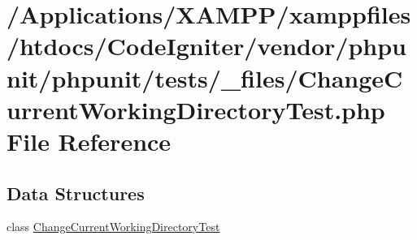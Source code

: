 \hypertarget{_change_current_working_directory_test_8php}{}\section{/\+Applications/\+X\+A\+M\+P\+P/xamppfiles/htdocs/\+Code\+Igniter/vendor/phpunit/phpunit/tests/\+\_\+files/\+Change\+Current\+Working\+Directory\+Test.php File Reference}
\label{_change_current_working_directory_test_8php}
\subsection*{Data Structures}
\begin{DoxyCompactItemize}
\item 
class \mbox{\hyperlink{class_change_current_working_directory_test}{Change\+Current\+Working\+Directory\+Test}}
\end{DoxyCompactItemize}

